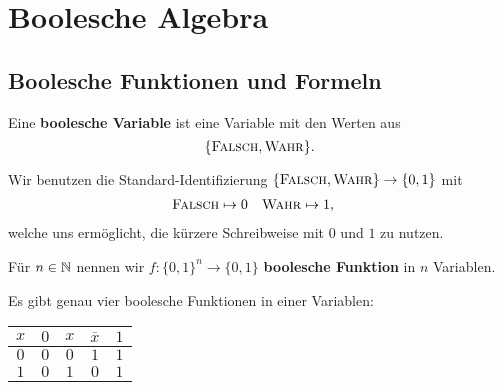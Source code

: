 \chapter{Boolesche Algebra}

\section{Boolesche Funktionen und Formeln} 

\begin{defn}
	Eine \textbf{boolesche Variable} ist eine Variable mit den Werten aus 
	\[
		\{\mathop{\text{\textsc{Falsch}}},\mathop{\text{\textsc{Wahr}}}\}.
	\] 
\end{defn} 

\begin{bem}
Wir benutzen die Standard-Identifizierung $\{\mathop{\text{\textsc{Falsch}}},\mathop{\text{\textsc{Wahr}}}\} \to \{0,1\}$ mit 
\begin{align*}
	\mathop{\text{\textsc{Falsch}}} & \mapsto 0 & \mathop{\text{\textsc{Wahr}}} & \mapsto 1,
\end{align*}
welche uns ermöglicht, die kürzere Schreibweise mit $0$ und $1$ zu nutzen. 
\end{bem}

\begin{defn}
	Für $n \in \mathbb{N}$ nennen wir $f: \{0,1\}^n \to \{0,1\}$ \textbf{boolesche Funktion} in $n$ Variablen. 
\end{defn} 

\begin{bem} Es gibt genau vier boolesche Funktionen in einer Variablen: 
	\begin{center}
			\begin{tabular}{c|cccc}
				$x$ & $0$ & $x$  & $\overline{x}$ & $1$ 
				\\ \hline 
				$0$ & $0$ & $0$ &  $1$ & $1$
				\\ $1$ & $0$ & $1$ & $0$ & $1$ 
			\end{tabular} 
	\end{center} 
\end{bem} 

